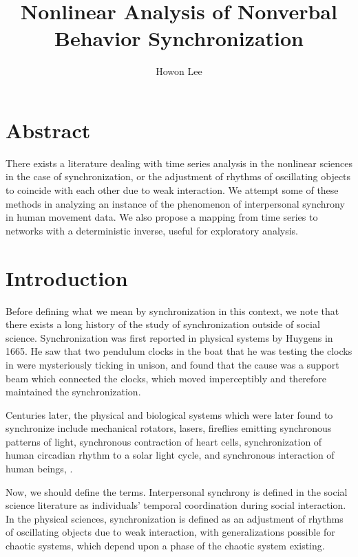 \documentclass[12pt]{article}
\begin{document}
\title{Nonlinear Analysis of Nonverbal Behavior Synchronization}
\author{Howon Lee}
\maketitle

\section{Abstract}
There exists a literature dealing with time series analysis in the nonlinear sciences in the case of synchronization, or the adjustment of rhythms of oscillating objects to coincide with each other due to weak interaction. We attempt some of these methods in analyzing an instance of the phenomenon of interpersonal synchrony in human movement data. We also propose a mapping from time series to networks with a deterministic inverse, useful for exploratory analysis.

\section{Introduction}

Before defining what we mean by synchronization in this context, we note that there exists a long history of the study of synchronization outside of social science. Synchronization was first reported in physical systems by Huygens in 1665. He saw that two pendulum clocks in the boat that he was testing the clocks in were mysteriously ticking in unison, and found that the cause was a support beam which connected the clocks, which moved imperceptibly and therefore maintained the synchronization\cite{physsync}.

Centuries later, the physical and biological systems which were later found to synchronize include mechanical rotators, lasers, fireflies emitting synchronous patterns of light, synchronous contraction of heart cells, synchronization of human circadian rhythm to a solar light cycle, and synchronous interaction of human beings\cite{syncreview}, \cite{physsync}.

Now, we should define the terms. Interpersonal synchrony is defined in the social science literature as individuals' temporal coordination during social interaction\cite{socialsync}. In the physical sciences, synchronization is defined as an adjustment of rhythms of oscillating objects due to weak interaction, with generalizations possible for chaotic systems, which depend upon a phase of the chaotic system existing\cite{physsync}.
\end{document}
